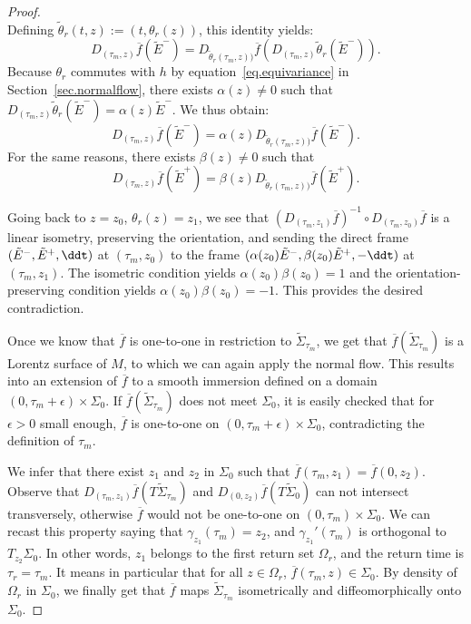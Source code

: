 \begin{proof}
\[\]
Defining $\tilde{\theta}_r(t,z):=(t,\theta_r(z))$, this identity yields:
\[
D_{(\tau_m,z)}{\overline{f}}(\tilde{E}^{-})=D_{\tilde{\theta}_r(\tau_m,z))}{\overline{f}}(D_{(\tau_m,z)}\tilde{\theta}_r(\tilde{E}^-)).
\]
Because $\theta_r$ commutes with $h$ by equation~\eqref{eq.equivariance} in Section~\ref{sec.normalflow}, there exists $\alpha(z) \not = 0$ such that $D_{(\tau_m,z)}\tilde{\theta}_r(\tilde{E}^-)=\alpha(z)\tilde{E}^-$. We thus obtain:
\[
D_{(\tau_m,z)}{\overline{f}}(\tilde{E}^{-})= \alpha(z) D_{\tilde{\theta}_r(\tau_m,z))}{\overline{f}}(\tilde{E}^-).
\]
For the same reasons, there exists $\beta(z) \not =0$ such that
\[
D_{(\tau_m,z)}{\overline{f}}(\tilde{E}^{+})= \beta(z) D_{\tilde{\theta}_r(\tau_m,z))}{\overline{f}}(\tilde{E}^+).
\]

Going back to $z=z_0$, $\theta_r(z)=z_1$, we see that $(D_{(\tau_m,z_1)}{\overline{f}})^{-1} \circ D_{(\tau_m,z_0)}{\overline{f}}$ is a linear isometry, preserving the orientation, and sending the direct frame $(\tilde{E}^-,\tilde{E}^+,\ddt)$ at $(\tau_m,z_0)$ to the frame $(\alpha(z_0) \tilde{E}^-, \beta(z_0) \tilde{E}^+,-\ddt)$ at $(\tau_m,z_1)$. The isometric condition yields $\alpha(z_0) \beta(z_0)=1$ and the orientation-preserving condition yields $ \alpha(z_0) \beta(z_0)=-1$. This provides the desired contradiction.


Once we know that ${\overline{f}}$ is one-to-one in restriction to $\tilde{\Sigma}_{\tau_m}$, we get that ${\overline{f}}(\tilde{\Sigma}_{\tau_m})$ is a Lorentz surface of $M$, to which we can again apply the normal flow. This results into an extension of ${\overline{f}}$ to a smooth immersion defined on a domain $(0,\tau_m+\epsilon) \times \Sigma_0$. If ${\overline{f}}(\tilde{\Sigma}_{\tau_m})$ does not meet $\Sigma_0$, it is easily checked that for $\epsilon>0$ small enough, ${\overline{f}}$ is one-to-one on $(0,\tau_m+\epsilon) \times \Sigma_0$, contradicting the definition of $\tau_m$.

We infer that there exist $z_1$ and $z_2$ in $\Sigma_0$ such that ${\overline{f}}(\tau_m,z_1)={\overline{f}}(0,z_2)$. Observe that $D_{(\tau_m,z_1)}{\overline{f}}(T\tilde{\Sigma}_{\tau_m})$ and $D_{(0,z_2)}{\overline{f}}(T \tilde{\Sigma}_0)$ can not intersect transversely, otherwise ${\overline{f}}$ would not be one-to-one on $(0,\tau_m) \times \Sigma_0$. We can recast this property saying that $\gamma_{z_1}(\tau_m)=z_2$, and $\gamma_{z_1}'(\tau_m)$ is orthogonal to $T_{z_2} \Sigma_0$. In other words, $z_1$ belongs to the first return set $\Omega_r$, and the return time is $\tau_r=\tau_m$. It means in particular that for all $z \in \Omega_r$, ${\overline{f}}(\tau_m,z) \in \Sigma_0$. By density of $\Omega_r$ in $\Sigma_0$, we finally get that ${\overline{f}}$ maps $\tilde{\Sigma}_{\tau_m}$ isometrically and diffeomorphically onto $\Sigma_0$.
\end{proof}



